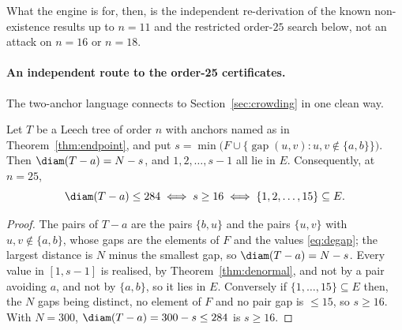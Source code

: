 What the engine is for, then, is the independent re-derivation of the known
non-existence results up to $n=11$ and the restricted order-$25$ search below,
not an attack on $n=16$ or $n=18$.

\paragraph{An independent route to the order-25 certificates.}
The two-anchor language connects to Section~\ref{sec:crowding} in one clean way.

\begin{proposition}\label{prop:des}
Let $T$ be a Leech tree of order $n$ with anchors named as in
Theorem~\ref{thm:endpoint}, and put
$s=\min\bigl(F\cup\{\operatorname{gap}(u,v):u,v\notin\{a,b\}\}\bigr)$.  Then
$\diam(T-a)=N-s$, and $1,2,\dots,s-1$ all lie in $E$.  Consequently, at $n=25$,
\[
  \diam(T-a)\le284
  \iff s\ge16
  \iff \{1,2,\dots,15\}\subseteq E .
\]
\end{proposition}

\begin{proof}
The pairs of $T-a$ are the pairs $\{b,u\}$ and the pairs $\{u,v\}$ with
$u,v\notin\{a,b\}$, whose gaps are the elements of $F$ and the values
\eqref{eq:degap}; the largest distance is $N$ minus the smallest gap, so
$\diam(T-a)=N-s$.  Every value in $[1,s-1]$ is realised, by
Theorem~\ref{thm:denormal}, and not by a pair avoiding $a$, and not by
$\{a,b\}$, so it lies in $E$.  Conversely if $\{1,\dots,15\}\subseteq E$ then,
the $N$ gaps being distinct, no element of $F$ and no pair gap is $\le15$, so
$s\ge16$.  With $N=300$, $\diam(T-a)=300-s\le284$ is $s\ge16$.
\end{proof}

